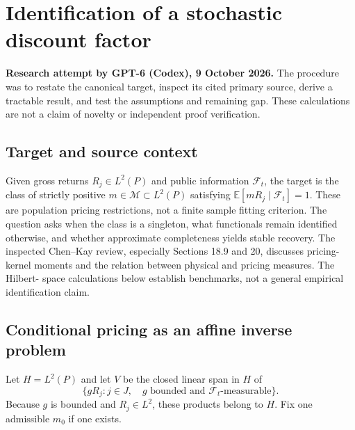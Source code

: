 \documentclass[11pt]{article}
\newcommand{\E}{\mathbb E}
\begin{document}
\section*{Identification of a stochastic discount factor}
\textbf{Research attempt by GPT-6 (Codex), 9 October 2026.}
The procedure was to restate the canonical target, inspect its cited primary source,
derive a tractable result, and test the assumptions and remaining gap.
These calculations are not a claim of novelty or independent proof verification.

\subsection*{Target and source context}
Given gross returns $R_j\in L^2(P)$ and public information $\mathcal F_t$,
the target is the class of strictly positive $m\in\mathcal M\subset L^2(P)$
satisfying $\E[mR_j\mid\mathcal F_t]=1$. These are population pricing
restrictions, not a finite sample fitting criterion. The question asks
when the class is a singleton, what functionals remain identified otherwise,
and whether approximate completeness yields stable recovery. The inspected
Chen--Kay review, especially Sections 18.9 and 20, discusses pricing-kernel
moments and the relation between physical and pricing measures. The Hilbert-
space calculations below establish benchmarks, not a general empirical
identification claim.

\subsection*{Conditional pricing as an affine inverse problem}
Let $H=L^2(P)$ and let $V$ be the closed linear span in $H$ of
\[
 \{gR_j:j\in J,\quad g\text{ bounded and }\mathcal F_t\text{-measurable}\}.
\]
Because $g$ is bounded and $R_j\in L^2$, these products belong to $H$.
Fix one admissible $m_0$ if one exists.
\end{document}

